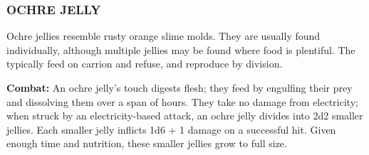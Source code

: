 \begin{multicols}{2}
\subsubsection{OCHRE JELLY}

Ochre jellies resemble rusty orange slime molds. They are usually found individually, although multiple jellies may be found where food is plentiful. The typically feed on carrion and refuse, and reproduce by division.

\textbf{Combat:} An ochre jelly's touch digests flesh; they feed by engulfing their prey and dissolving them over a span of hours. They take no damage from electricity; when struck by an electricity-based attack, an ochre jelly divides into 2d2 smaller jellies. Each smaller jelly inflicts 1d6 + 1 damage on a successful hit. Given enough time and nutrition, these smaller jellies grow to full size.

\end{multicols}

